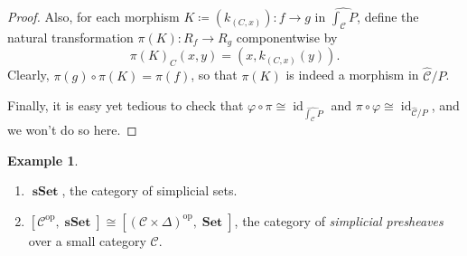 \documentclass[10pt,letterpaper,cm]{nupset}
\theoremstyle{definition}
\newtheorem{exmp}[definition]{Example}
\theoremstyle{theorem}
\theoremstyle{remark}
\newcommand{\0}{\mathbf{0}}
\newcommand{\1}{\mathbf{1}}
\newcommand{\2}{\mathbf{2}}
\DeclareMathOperator{\op}{op}
\DeclareMathOperator{\sset}{\mathbf{sSet}}
\DeclareMathOperator{\set}{\mathbf{Set}}
\renewcommand{\c}{\mathscr{C}}
\DeclareMathOperator{\idd}{id}
\newcommand{\be}{\begin{enumerate}}
\newcommand{\ee}{\end{enumerate}}
\begin{document}
\begin{proof}
\smallskip

Also, for each morphism $K \coloneqq \left(k_{(C,x)}\right) : f \to g$ in $ \widehat{\int_{\c}{P}}$, define the natural transformation \linebreak $\pi(K) : R_f \to R_g$ componentwise by  $$\pi(K)_C(x,y) = \left(x, k_{\left(C,x\right)}(y)\right).$$ Clearly, $\pi(g) \circ \pi(K) = \pi(f)$, so that $\pi(K)$ is indeed a morphism in $\widehat{\c}/P$.

\medskip

Finally, it is easy yet tedious to check that $\varphi \circ \pi \cong \idd_{ \widehat{\int_{\c}{P}} }$ and $\pi \circ \varphi \cong \idd_{ \widehat{\c}/P}$, and we won't do so here.
\end{proof}

\begin{exmp} $ $
\be
\item $\sset$, the category of simplicial sets.
\item $\left[\c^{\op}, \sset\right] \cong \left[\left(\c \times \varDelta\right)^{\op}, \set\right]$, the category of \textit{simplicial presheaves} over a small category $\c$.
\ee
\end{exmp}

\printbibliography[
heading=bibintoc,
title={References}
]
\end{document}
